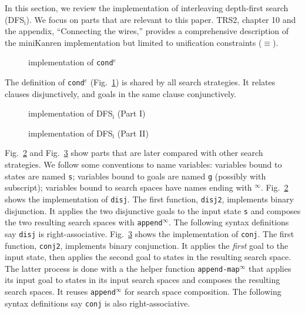 \documentclass[format=acmlarge, review=true, authordraft=true]{acmart}
\newcommand{\conde}{\texttt{cond$^e$}}
\newcommand{\conj}{\texttt{conj}}
\newcommand{\disj}{\texttt{disj}}
\newcommand{\DFSi }[0]{DFS$_\textrm{i}$}
\begin{document}
In this section, we review the implementation of interleaving depth-first 
search (\DFSi). We focus on parts that are relevant to this paper. TRS2,
chapter 10 and the appendix, ``Connecting the wires,'' 
provides a comprehensive description of the 
miniKanren 
implementation but limited to unification constraints ($\equiv$).

\begin{figure}
	
	\caption{implementation of \conde}
	\label{conde}
\end{figure}

The definition of \conde{} (Fig.~\ref{conde}) is shared by all search 
strategies. It relates clauses disjunctively, and goals in the same 
clause conjunctively.

\begin{figure}
	
	\caption{implementation of \DFSi{} (Part I)}
	\label{DFSi-0}
\end{figure}

\begin{figure}
	
	\caption{implementation of \DFSi{} (Part II)}
	\label{DFSi-1}
\end{figure}


Fig.~\ref{DFSi-0} and Fig.~\ref{DFSi-1} show parts that are later compared 
with other search 
strategies. We follow some conventions to name variables: variables bound to 
states are named \texttt{s}; variables bound to goals are named \texttt{g} 
(possibly with subscript); variables bound to search spaces have names ending 
with $^\infty$. Fig.~\ref{DFSi-0} shows the implementation of \disj. The 
first function, \texttt{disj2}, implements binary disjunction. It applies the 
two disjunctive goals to the input state \texttt{s} and composes the two 
resulting search spaces with \texttt{append$^\infty$}. The following syntax 
definitions say \disj{} is right-associative. Fig.~\ref{DFSi-1} 
shows the implementation of \conj. The first function, \texttt{conj2}, 
implements binary conjunction. 
It applies the \emph{first} goal to the input state, then applies the second 
goal to states in the resulting search space. The latter process is done with a 
the helper function \texttt{append-map$^\infty$} that applies its input goal to states 
in its input search spaces and composes the resulting search spaces. It reuses 
\texttt{append$^\infty$} for search space composition. The following syntax 
definitions say \conj{} is also right-associative.
\end{document}
